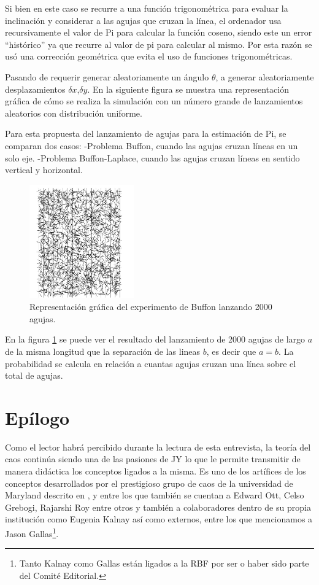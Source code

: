 \documentclass{rbf}
\begin{document}
Si bien en este caso se recurre a una función trigonométrica para evaluar la inclinación y considerar a las agujas que cruzan la línea, el ordenador usa recursivamente el valor de Pi para calcular la función coseno, siendo este un error “histórico” ya que recurre al valor de pi para calcular al mismo. Por esta razón se usó una corrección geométrica que evita el uso de funciones trigonométricas.

Pasando de requerir generar aleatoriamente un ángulo $\theta$, a generar aleatoriamente desplazamientos $\delta x$,$\delta y$. En la siguiente figura se muestra una representación gráfica de cómo se realiza la simulación con un número grande de lanzamientos aleatorios con distribución uniforme. \cite{Statistics}

Para esta propuesta del lanzamiento de agujas para la estimación de Pi, se comparan dos casos:
-Problema Buffon, cuando las agujas cruzan líneas en un solo eje.
-Problema Buffon-Laplace, cuando las agujas cruzan líneas en sentido vertical y horizontal.




\begin{figure}[tbp!]
 \centering
  \includegraphics[width=0.4\textwidth]{figures/buffon.jpg}
	\caption{Representación gráfica del experimento de Buffon lanzando 2000 agujas.\cite{Statistics}}
 \label{buff}
\end{figure}


En la figura \ref{buff} se puede ver el resultado del lanzamiento de 2000 agujas de largo $a$ de la misma longitud que la separación de las lineas $b$, es decir que $a=b$. La probabilidad se calcula en relación a cuantas agujas cruzan una línea sobre el total de agujas. 



\section{Epílogo}\label{epi}
Como el lector habrá percibido durante la lectura de esta entrevista, la teoría del caos continúa siendo una de las pasiones de JY lo que le permite transmitir de manera didáctica los conceptos ligados a la misma. Es uno de los artífices de los conceptos desarrollados por el prestigioso grupo de caos de la universidad de Maryland descrito en \cite{UMD17}, y entre los que también se cuentan a Edward Ott, Celso Grebogi, Rajarshi Roy entre otros y también a colaboradores dentro de su propia institución como Eugenia Kalnay así como externos, entre los que mencionamos a Jason Gallas\footnote{Tanto Kalnay como Gallas están ligados a la RBF por ser o haber sido parte del Comité Editorial.}.
\end{document}

